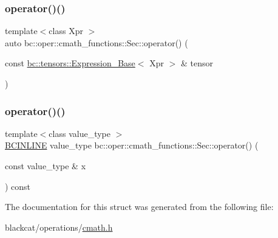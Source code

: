 \mbox{\label{structbc_1_1oper_1_1cmath__functions_1_1Sec_a4b324f4b2d79068c5523349d07b5565f}} 
\subsubsection{\texorpdfstring{operator()()}{operator()()}\hspace{0.1cm}{\footnotesize\ttfamily [2/3]}}
{\footnotesize\ttfamily template$<$class Xpr $>$ \\
auto bc\+::oper\+::cmath\+\_\+functions\+::\+Sec\+::operator() (\begin{DoxyParamCaption}\item[{const \hyperlink{classbc_1_1tensors_1_1Expression__Base}{bc\+::tensors\+::\+Expression\+\_\+\+Base}$<$ Xpr $>$ \&}]{tensor }\end{DoxyParamCaption})\hspace{0.3cm}{\ttfamily [inline]}}

\mbox{\label{structbc_1_1oper_1_1cmath__functions_1_1Sec_aa1a9cae92fbc6ea4edc6527c9951d9ca}} 
\subsubsection{\texorpdfstring{operator()()}{operator()()}\hspace{0.1cm}{\footnotesize\ttfamily [3/3]}}
{\footnotesize\ttfamily template$<$class value\+\_\+type $>$ \\
\hyperlink{common_8h_a6699e8b0449da5c0fafb878e59c1d4b1}{B\+C\+I\+N\+L\+I\+NE} value\+\_\+type bc\+::oper\+::cmath\+\_\+functions\+::\+Sec\+::operator() (\begin{DoxyParamCaption}\item[{const value\+\_\+type \&}]{x }\end{DoxyParamCaption}) const\hspace{0.3cm}{\ttfamily [inline]}}



The documentation for this struct was generated from the following file\+:\begin{DoxyCompactItemize}
\item 
blackcat/operations/\hyperlink{cmath_8h}{cmath.\+h}\end{DoxyCompactItemize}
